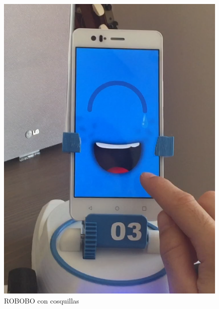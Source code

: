 \begin{figure}
\begin{minipage}{0.45\textwidth}
\end{minipage}\hfill
\begin{minipage}{0.45\textwidth}
\centering
\includegraphics[width=1\linewidth]{imagenes/pet_tickles.png}

\caption{ROBOBO con cosquillas}
\label{fig:pet_tickles}

\end{minipage}
\end{figure}






